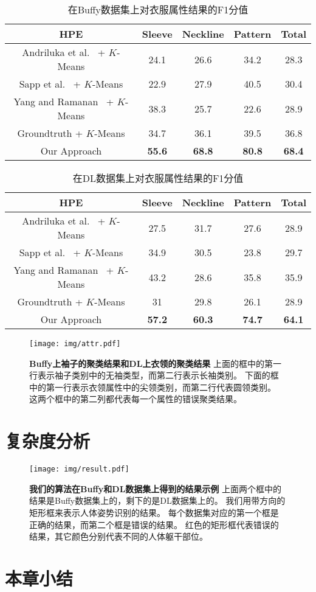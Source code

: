 \begin{table}
\centering
\caption{在Buffy数据集上对衣服属性结果的F1分值}
\begin{tabular}{|c|c|c|c|c|} \hline
    HPE & Sleeve & Neckline & Pattern & Total \\ \hline
Andriluka et al.~\cite{cvpr09} + $K$-Means & 24.1 & 26.6 & 34.2 & 28.3  \\ \hline
Sapp et al.~\cite{eccv10} + $K$-Means & 22.9 & 27.9 & 40.5 & 30.4 \\ \hline
Yang and Ramanan~\cite{deva11} + $K$-Means & 38.3 & 25.7 & 22.6 & 28.9\\ \hline
Groundtruth + $K$-Means & 34.7 & 36.1 & 39.5 & 36.8\\ \hline
Our Approach & \textbf{55.6} & \textbf{68.8} & \textbf{80.8} & \textbf{68.4}  \\ \hline
\end{tabular}
\label{tb:f1_buffy}
\end{table}


\begin{table}
\centering
\caption{在DL数据集上对衣服属性结果的F1分值}
\begin{tabular}{|c|c|c|c|c|} \hline
    HPE & Sleeve & Neckline & Pattern & Total \\ \hline
Andriluka et al.~\cite{cvpr09} + $K$-Means & 27.5 & 31.7 & 27.6 & 28.9  \\ \hline
Sapp et al.~\cite{eccv10} + $K$-Means & 34.9 & 30.5 & 23.8 & 29.7 \\ \hline
Yang and Ramanan~\cite{deva11} + $K$-Means & 43.2 & 28.6 & 35.8 & 35.9 \\ \hline
Groundtruth  + $K$-Means & 31 & 29.8 & 26.1 & 28.9 \\ \hline
Our Approach & \textbf{57.2} & \textbf{60.3} & \textbf{74.7} & \textbf{64.1}  \\ \hline
\end{tabular}
\label{tb:f1_dl}
\end{table}


\begin{figure*}[tbp]
\centering
\texttt{[image: img/attr.pdf]}
\caption{ \textbf{Buffy上袖子的聚类结果和DL上衣领的聚类结果}
上面的框中的第一行表示袖子类别中的无袖类型，而第二行表示长袖类别。
下面的框中的第一行表示衣领属性中的尖领类别，而第二行代表圆领类别。
这两个框中的第二列都代表每一个属性的错误聚类结果。
}
\label{fig:sleeve}
\end{figure*}

\section{复杂度分析}

\begin{figure}
\centering
\texttt{[image: img/result.pdf]}
\caption{ \textbf{我们的算法在Buffy和DL数据集上得到的结果示例}
上面两个框中的结果是Buffy数据集上的，剩下的是DL数据集上的。
我们用带方向的矩形框来表示人体姿势识别的结果。
每个数据集对应的第一个框是正确的结果，而第二个框是错误的结果。
红色的矩形框代表错误的结果，其它颜色分别代表不同的人体躯干部位。
}
\label{fig:result}
\end{figure}

\section{本章小结}
